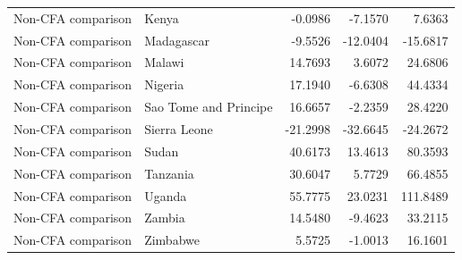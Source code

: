 \begin{table}
\begin{tabular}[t]{llrrr}
Non-CFA comparison & Kenya & -0.0986 & -7.1570 & 7.6363\\
\addlinespace
Non-CFA comparison & Madagascar & -9.5526 & -12.0404 & -15.6817\\
Non-CFA comparison & Malawi & 14.7693 & 3.6072 & 24.6806\\
Non-CFA comparison & Nigeria & 17.1940 & -6.6308 & 44.4334\\
Non-CFA comparison & Sao Tome and Principe & 16.6657 & -2.2359 & 28.4220\\
Non-CFA comparison & Sierra Leone & -21.2998 & -32.6645 & -24.2672\\
\addlinespace
Non-CFA comparison & Sudan & 40.6173 & 13.4613 & 80.3593\\
Non-CFA comparison & Tanzania & 30.6047 & 5.7729 & 66.4855\\
Non-CFA comparison & Uganda & 55.7775 & 23.0231 & 111.8489\\
Non-CFA comparison & Zambia & 14.5480 & -9.4623 & 33.2115\\
Non-CFA comparison & Zimbabwe & 5.5725 & -1.0013 & 16.1601\\
\bottomrule
\end{tabular}
\end{table}